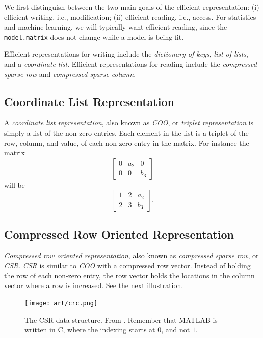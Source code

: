 \documentclass[]{book}
\theoremstyle{definition}
\theoremstyle{definition}
\theoremstyle{definition}
\theoremstyle{remark}
\begin{document}
We first distinguish between the two main goals of the efficient representation:
(i) efficient writing, i.e., modification;
(ii) efficient reading, i.e., access.
For statistics and machine learning, we will typically want efficient reading, since the \texttt{model.matrix} does not change while a model is being fit.

Efficient representations for writing include the \emph{dictionary of keys}, \emph{list of lists}, and a \emph{coordinate list}.
Efficient representations for reading include the \emph{compressed sparse row} and \emph{compressed sparse column}.

\hypertarget{coo}{%
\subsection{Coordinate List Representation}\label{coo}}

A \emph{coordinate list representation}, also known as \emph{COO}, or \emph{triplet representation} is simply a list of the non zero entries.
Each element in the list is a triplet of the row, column, and value, of each non-zero entry in the matrix.
For instance the matrix
\[ \begin{bmatrix}
0 & a_2 & 0 \\
0 & 0 & b_3 
\end{bmatrix}  \]
will be
\[ \begin{bmatrix}
1 & 2 & a_2 \\
2 & 3 & b_3 
\end{bmatrix}.  \]

\hypertarget{compressed-row-oriented-representation}{%
\subsection{Compressed Row Oriented Representation}\label{compressed-row-oriented-representation}}

\emph{Compressed row oriented representation}, also known as \emph{compressed sparse row}, or \emph{CSR}.
\emph{CSR} is similar to \emph{COO} with a compressed row vector.
Instead of holding the row of each non-zero entry, the row vector holds the locations in the column vector where a row is increased.
See the next illustration.

\begin{figure}
\centering
\texttt{[image: art/crc.png]}
\caption{The CSR data structure. From \citet{shah2004sparse}. Remember that MATLAB is written in C, where the indexing starts at \(0\), and not \(1\).}
\end{figure}
\end{document}
